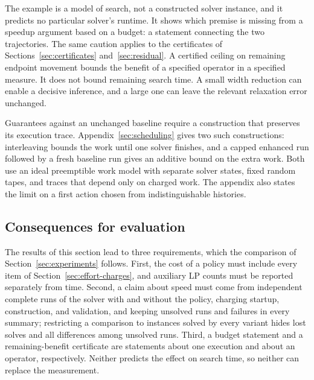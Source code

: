 The example is a model of search, not a constructed solver instance, and it
predicts no particular solver's runtime. It shows which premise is missing from
a speedup argument based on a budget: a statement connecting the two
trajectories. The same caution applies to the certificates of
Sections~\ref{sec:certificates} and~\ref{sec:residual}. A certified ceiling on
remaining endpoint movement bounds the benefit of a specified operator in a
specified measure. It does not bound remaining search time. A small width
reduction can enable a decisive inference, and a large one can leave the
relevant relaxation error unchanged.

Guarantees against an unchanged baseline require a construction that
preserves its execution trace. Appendix~\ref{sec:scheduling} gives two such
constructions: interleaving bounds the work until one solver finishes, and a
capped enhanced run followed by a fresh baseline run gives an additive
bound on the extra work. Both use an ideal preemptible work model with
separate solver states, fixed random tapes, and traces that depend only on
charged work. The appendix also states the limit on a first action chosen
from indistinguishable histories.

\subsection{Consequences for evaluation}\label{sec:effort-evaluation}

The results of this section lead to three requirements, which the comparison
of Section~\ref{sec:experiments} follows. First, the cost of a policy must
include every item of Section~\ref{sec:effort-charges}, and auxiliary LP counts
must be reported separately from time. Second, a claim about speed must come
from independent complete runs of the solver with and without the policy,
charging startup, construction, and validation, and keeping unsolved runs and
failures in every summary; restricting a comparison to instances solved by
every variant hides lost solves and all differences among unsolved runs.
Third, a budget statement and a remaining-benefit certificate are
statements about one execution and about an operator, respectively. Neither
predicts the effect on search time, so neither can replace the measurement.
